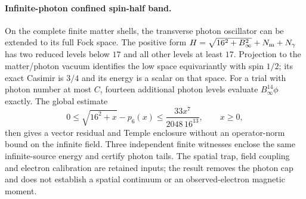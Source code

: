 \paragraph{Infinite-photon confined spin-half band.}
On the complete finite matter shells, the transverse photon oscillator can
be extended to its full Fock space. The positive form
$H=\sqrt{16^2+B_\infty^2}+N_{\rm m}+N_\gamma$ has two reduced levels below
$17$ and all other levels at least $17$. Projection to the matter/photon
vacuum identifies the low space equivariantly with spin $1/2$; its exact
Casimir is $3/4$ and its energy is a scalar on that space.
For a trial with photon number at most $C$, fourteen additional photon
levels evaluate $B_\infty^{14}\phi$ exactly. The global estimate
\[
0\leq\sqrt{16^2+x}-p_6(x)
 \leq \frac{33x^7}{2048\,16^{13}},\qquad x\geq0,
\]
then gives a vector residual and Temple enclosure without an operator-norm
bound on the infinite field. Three independent finite witnesses enclose the
same infinite-source energy and certify photon tails. The spatial trap,
field coupling and electron calibration are retained inputs; the result
removes the photon cap and does not establish a spatial continuum or an
observed-electron magnetic moment.
